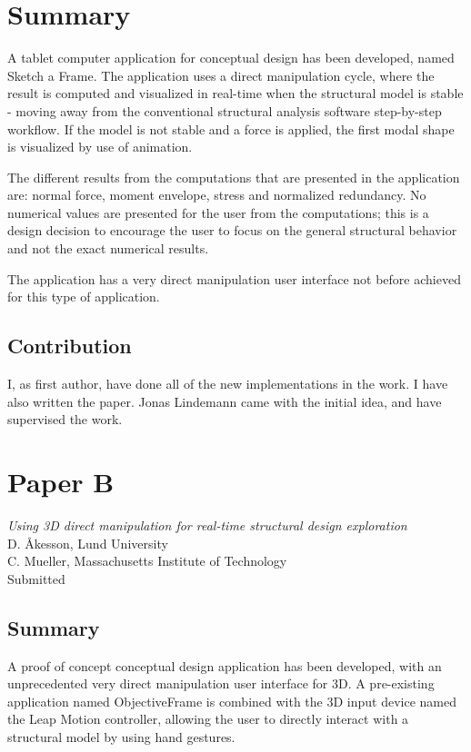 \section*{Summary}

A tablet computer application for conceptual design has been developed, named Sketch a Frame. The application uses a direct manipulation cycle, where the result is computed and visualized in real-time when the structural model is stable - moving away from the conventional structural analysis software step-by-step workflow. If the model is not stable and a force is applied, the first modal shape is visualized by use of animation.

The different results from the computations that are presented in the application are: normal force, moment envelope, stress and normalized redundancy. No numerical values are presented for the user from the computations; this is a design decision to encourage the user to focus on the general structural behavior and not the exact numerical results. 

The application has a very direct manipulation user interface not before achieved for this type of application.

\subsection*{Contribution}
I, as first author, have done all of the new implementations in the work. I have also written the paper. Jonas Lindemann came with the initial idea, and have supervised the work.

\newpage
\section{Paper B}
\textit{Using 3D direct manipulation for real-time structural design exploration} \\
D. Åkesson, Lund University \\
C. Mueller, Massachusetts Institute of Technology \\
Submitted

\subsection*{Summary}

A proof of concept conceptual design application has been developed, with an unprecedented very direct manipulation user interface for 3D. A pre-existing application named ObjectiveFrame is combined with the 3D input device named the Leap Motion controller, allowing the user to directly interact with a structural model by using hand gestures.

